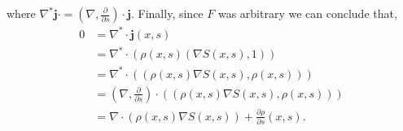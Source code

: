 \documentclass[a4paper,12pt,draft]{report}
\begin{document}
{$$$$
where $\nabla^*\mathbf{j} \cdot = \left(\nabla, \frac{\partial}{\partial s}\right) \cdot\mathbf{j}$.  Finally, since $F$ was arbitrary we can conclude that,
\begin{align}
0 & = \nabla^* \cdot \mathbf{j}(x, s)\nonumber\\
& = \nabla^* \cdot (\rho(x, s)(\nabla S(x, s), 1))\nonumber\\
& = \nabla^* \cdot ((\rho(x, s)\nabla S(x, s), \rho(x, s)))\nonumber\\
& = \left(\nabla, \frac{\partial}{\partial s}\right)\cdot((\rho(x, s)\nabla S(x, s), \rho(x, s)))\nonumber\\
& = \nabla\cdot(\rho(x, s)\nabla S(x, s)) + \frac{\partial \rho}{\partial s}(x, s).\nonumber
\end{align}

\qedhere
}
\end{document}

